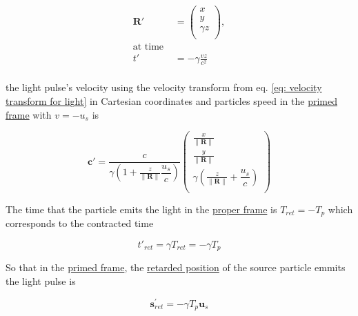 \begin{equation}
	\label{eq: displacement transform}
	\begin{aligned}
		\mathbf{R}{'} & =
		\begin{pmatrix}
			x          \\
			y          \\
			{\gamma} z \\
		\end{pmatrix},                            \\
		\text{at time \ \ \ }                     \\
		t{'}          & = - {\gamma} \frac{vz}{c^2} \\
	\end{aligned}
\end{equation}

the light pulse's velocity using the velocity transform from eq. \eqref{eq: velocity transform for light} in Cartesian coordinates and particles speed in the \hyperlink{def-Primed-Frame}{primed frame} with $v=-u_s$ is

\begin{equation}
	\label{eq: light pulse velocity transform}
	\mathbf{c}{'} = \dfrac{c}{{\gamma}\left(1 + \frac{z}{\|\mathbf{R}\|} \dfrac{u_s}{c} \right)}
	\begin{pmatrix}
		\frac{x}{\|\mathbf{R}\|}                                          \\
		\frac{y}{\|\mathbf{R}\|}                                          \\
		{\gamma} \left( \frac{z}{\|\mathbf{R}\|} + \dfrac{u_s}{c} \right) \\
	\end{pmatrix}
\end{equation}


The time that the particle emits the light in the \hyperlink{def-proper-frame}{proper frame} is ${T}_{ret}= - {T}_{p}$ which corresponds to the contracted time

\begin{equation}
	t{'}_{ret}= {\gamma} {T}_{ret} = - {\gamma} {T}_{p}
\end{equation}

So that in the \hyperlink{def-Primed-Frame}{primed frame}, the \hyperlink{def-retarded-position}{retarded position} of the source particle emmits the light pulse is

\begin{equation}
	\mathbf{s}_{ret}^{'} = - {\gamma} {T}_{p} \mathbf{u}_s
\end{equation}

